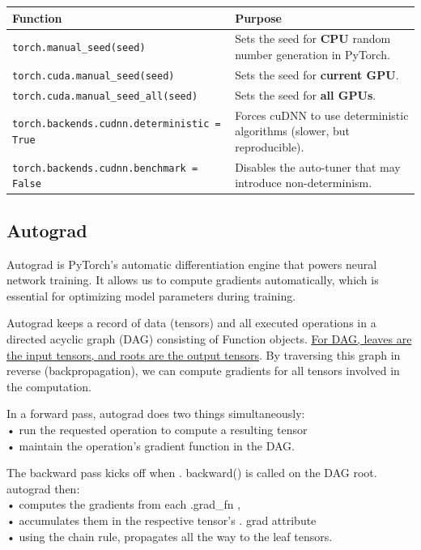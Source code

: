 \documentclass[12pt, a4paper]{article}
\begin{document}
\begin{center}
\begin{tabular}{|l|p{}|}
\hline
\textbf{Function} & \textbf{Purpose} \\
\hline
\texttt{torch.manual\_seed(seed)} & Sets the seed for \textbf{CPU} random number generation in PyTorch. \\
\hline
\texttt{torch.cuda.manual\_seed(seed)} & Sets the seed for \textbf{current GPU}. \\
\hline
\texttt{torch.cuda.manual\_seed\_all(seed)} & Sets the seed for \textbf{all GPUs}. \\
\hline
\texttt{torch.backends.cudnn.deterministic = True} & Forces cuDNN to use deterministic algorithms (slower, but reproducible). \\
\hline
\texttt{torch.backends.cudnn.benchmark = False} & Disables the auto-tuner that may introduce non-determinism. \\
\hline
\end{tabular}
\end{center}

\subsection{Autograd}

Autograd is PyTorch's automatic differentiation engine that powers neural network training. It allows us to compute gradients automatically, which is essential for optimizing model parameters during training.

Autograd keeps a record of data (tensors) and all executed operations in a directed acyclic graph (DAG) consisting of Function objects. \ul{For DAG, leaves are the input tensors, and roots are the output tensors}. By traversing this graph in reverse (backpropagation), we can compute gradients for all tensors involved in the computation.

\vspace{1em}

In a forward pass, autograd does two things simultaneously: \\
• run the requested operation to compute a resulting tensor\\
• maintain the operation's gradient function in the DAG.

\vspace{0.5em}

The backward pass kicks off when . backward() is called on the DAG root. autograd then:\\
• computes the gradients from each .grad\_fn ,\\
• accumulates them in the respective tensor's . grad attribute \\
• using the chain rule, propagates all the way to the leaf tensors.
\end{document}
